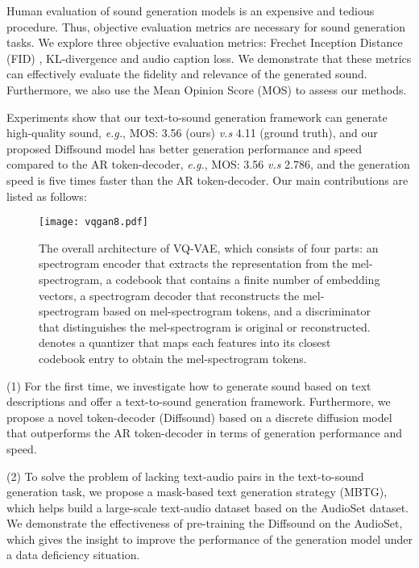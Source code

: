 \documentclass[lettersize,journal]{IEEEtran}
\begin{document}
Human evaluation of sound generation models is an expensive and tedious procedure. Thus, objective evaluation metrics are necessary for sound generation tasks. We explore three objective evaluation metrics: Frechet Inception Distance (FID) \cite{heusel2017gans}, KL-divergence \cite{iashin2021taming} and audio caption loss. We demonstrate that these metrics can effectively evaluate the fidelity and relevance of the generated sound. Furthermore, we also use the Mean Opinion Score (MOS) to assess our methods. 

Experiments show that our text-to-sound generation framework can generate high-quality sound, \textit{e.g.}, MOS: 3.56 (ours) \textit{v.s} 4.11 (ground truth), and our proposed Diffsound model has better generation performance and speed compared to the AR token-decoder, \textit{e.g.}, MOS: 3.56 \textit{v.s} 2.786, and the generation speed is five times faster than the AR token-decoder. Our main contributions are listed as follows:
\begin{figure}[t]
  \centering
  \texttt{[image: vqgan8.pdf]}
  \caption{The overall architecture of VQ-VAE, which consists of four parts: an spectrogram encoder that extracts the representation  from the mel-spectrogram, a codebook that contains a finite number of embedding vectors, a spectrogram decoder that reconstructs the mel-spectrogram based on mel-spectrogram tokens, and a discriminator that distinguishes the mel-spectrogram is original or reconstructed.  denotes a quantizer that maps each features  into its closest codebook entry  to obtain the mel-spectrogram tokens.}
  \label{fig:gan}
  \vspace*{-\baselineskip}
\end{figure}

(1) For the first time, we investigate how to generate sound based on text descriptions and offer a text-to-sound generation framework. Furthermore, we propose a novel token-decoder (Diffsound) based on a discrete diffusion model that outperforms the AR token-decoder in terms of generation performance and speed.

(2) To solve the problem of lacking text-audio pairs in the text-to-sound generation task, we propose a mask-based text generation strategy (MBTG), which helps build a large-scale text-audio dataset based on the AudioSet dataset. We demonstrate the effectiveness of pre-training the Diffsound on the AudioSet, which gives the insight to improve the performance of the generation model under a data deficiency situation.
\end{document}
